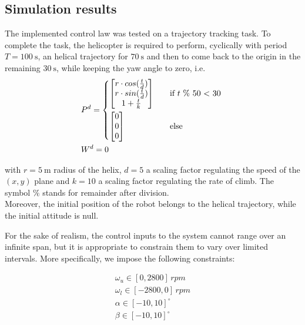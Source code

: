 \subsection{Simulation results} \label{sec:fbl_sim}
The implemented control law was tested on a trajectory tracking task. To complete the task, the helicopter is required to perform, cyclically with period $T = \qty{100}{\second}$, an helical trajectory for $\qty{70}{\second}$ and then to come back to the origin in the remaining $\qty{30}{\second}$, while keeping the yaw angle to zero, i.e.
\begin{align}
    &P^d=\begin{cases*}
        \begin{bmatrix}
            r\cdot cos(\frac{t}{d}) \\ r\cdot sin(\frac{t}{d})\\ 1+\frac{t}{k}
        \end{bmatrix} \quad &if $t$ \% 50 $<$ 30 \\
        \begin{bmatrix}
            0 \\ 0 \\ 0
         \end{bmatrix} \quad &else
    \end{cases*} \label{eq:pos_ref}\\
    &W^d=0 \label{eq:yaw_ref}
\end{align}

\noindent with $r=\qty{5}{\meter}$ radius of the helix, $d=5$ a scaling factor regulating the speed of the $(x,y)$ plane and $k=10$ a scaling factor regulating the rate of climb. The symbol $\%$ stands for remainder after division. \\
Moreover, the initial position of the robot belongs to the helical trajectory, while the initial attitude is null.

For the sake of realism, the control inputs to the system cannot range over an infinite span, but it is appropriate to constrain them to vary over limited intervals. More specifically, we impose the following constraints:

\begin{gather}
    \omega_u \in [0, 2800] \, \textit{rpm} \label{eq:omega_u_constraint} \\
    \omega_l \in [-2800, 0] \, \textit{rpm} \label{eq:omega_l_constraint} \\
    \alpha \in [-10, 10]^\circ \label{eq:alpha_constraint} \\
    \beta \in [-10, 10]^\circ \label{eq:beta_constraint}
\end{gather}

